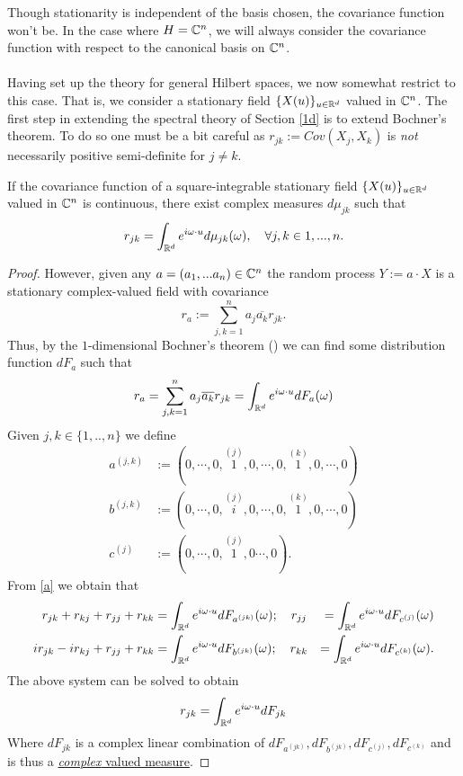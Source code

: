 \documentclass[
    a4paper,
    DIV=14,
    abstract=true,
    numbers=noenddot
]{scrartcl}
\begin{document}
Though stationarity is independent of the basis chosen, the covariance function won't be. In the case where  $H=\mathbb{C}^n$, we will always consider the covariance function with respect to the canonical basis on $\mathbb{C}^n$.
\\
\\
Having set up the theory for general Hilbert spaces, we now somewhat restrict to this case. That is, we consider a stationary field $\{X(u)\}_{u\in\mathbb{R}^d}$ valued in $\mathbb{C}^n$. The first step in extending the spectral theory of Section \ref{1d} is to extend Bochner's theorem. To do so one must be a bit careful as $r_{ j k }:=Cov(X_j,X_k)$ is \emph{not} necessarily positive semi-definite for $j\neq k$.
\begin{theorem}\label{bochner 3d}
	If the covariance function of a square-integrable stationary field $\{X(u)\}_{u\in\mathbb{R}^d}$ valued in $\mathbb{C}^n$ is continuous, there exist complex measures $d\mu_{jk}$ such that
	\begin{equation*}
		r_{jk}=\int_{\mathbb{R}^d} e^{i\omega \cdot u} d\mu _{j k}(\omega),\quad \forall j,k\in{1,...,n}.
	\end{equation*}
\end{theorem}
\begin{proof}
	However, given any $a=(a_1,...a_n)\in\mathbb{C}^n$ the random process
	$Y:=a\cdot X$ is a stationary complex-valued field with covariance
	\begin{equation*}
		r_a:=\sum_{j,k=1}^n a_j\overline{a_k}r_{jk}.
	\end{equation*}
	Thus, by the $1$-dimensional Bochner's theorem () we can find some distribution function $dF_a$ such that
	\begin{equation}\label{a}
		r_a= \sum_{j,k=1}^{n} a_j \overline{a_k}r_{jk}=\int_{\mathbb{R}^d}e^{i\omega\cdot u}dF_a(\omega)
	\end{equation}
	Given $j, k\in\{1,..,n\}$ we define
	\begin{align*}
		a^{(j,k)} & :=(0,\cdots,0,\overset{(j)}{1},0,\cdots,0,\overset{(k)}{1},0,\cdots,0) \\
		b^{(j,k)} & :=(0,\cdots,0,\overset{(j)}{i},0,\cdots,0,\overset{(k)}{1},0,\cdots,0) \\
		c^{(j)}   & :=(0,\cdots,0,\overset{(j)}{1},0\cdots,0).
	\end{align*}
	From \eqref{a} we obtain that
	\begin{align*}
		r_{jk}+r_{kj}+r_{jj}+r_{kk}   & =\int_{\mathbb{R}^d}e^{i\omega\cdot u}dF_{a^{(jk)}}(\omega);\quad r_{jj} & =\int_{\mathbb{R}^d}e^{i\omega\cdot u}dF_{c^{(j)}}(\omega)  \\
		ir_{jk}-ir_{kj}+r_{jj}+r_{kk} & =\int_{\mathbb{R}^d}e^{i\omega\cdot u}dF_{b^{(jk)}}(\omega);\quad r_{kk} & =\int_{\mathbb{R}^d}e^{i\omega\cdot u}dF_{c^{(k)}}(\omega).
	\end{align*}
	The above system can be solved to obtain
	\begin{equation*}
		r_{jk}=\int_{\mathbb{R}^d}e^{i\omega\cdot u}dF_{jk}
	\end{equation*}
	Where $dF_{jk}$ is a complex linear combination of $dF_{a^{(jk)}},dF_{b^{(jk)}}, dF_{c^(j)},dF_{c^{(k)}}$ and is thus a \href{https://en.wikipedia.org/wiki/Complex_measure}{\emph{complex} valued measure}.
\end{proof}
\end{document}
